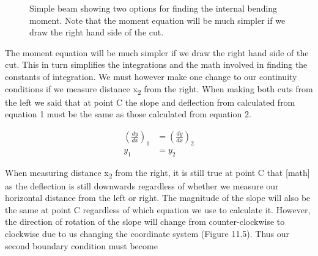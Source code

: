 \documentclass[
  letterpaper,
  DIV=11,
  numbers=noendperiod]{scrreprt}
\begin{document}
\begin{figure}


\caption{\label{fig-11.4}Simple beam showing two options for finding the
internal bending moment. Note that the moment equation will be much
simpler if we draw the right hand side of the cut.}

\end{figure}%

The moment equation will be much simpler if we draw the right hand side
of the cut. This in turn simplifies the integrations and the math
involved in finding the constants of integration. We must however make
one change to our continuity conditions if we measure distance
x\textsubscript{2} from the right. When making both cuts from the left
we said that at point C the slope and deflection from calculated from
equation 1 must be the same as those calculated from equation 2.

\[
\begin{aligned}
\left(\frac{d y}{d x}\right)_{1} & =\left(\frac{d y}{d x}\right)_{2} \\
y_{1} & =y_{2}
\end{aligned}
\]

When measuring distance x\textsubscript{2} from the right, it is still
true at point C that {[}math{]} as the deflection is still downwards
regardless of whether we measure our horizontal distance from the left
or right. The magnitude of the slope will also be the same at point C
regardless of which equation we use to calculate it. However, the
direction of rotation of the slope will change from counter-clockwise to
clockwise due to us changing the coordinate system (Figure 11.5). Thus
our second boundary condition must become
\end{document}
